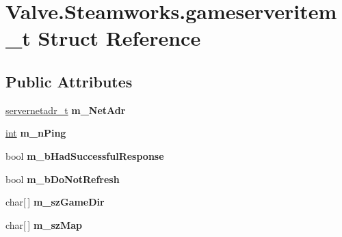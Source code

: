 \hypertarget{structValve_1_1Steamworks_1_1gameserveritem__t}{}\section{Valve.\+Steamworks.\+gameserveritem\+\_\+t Struct Reference}
\label{structValve_1_1Steamworks_1_1gameserveritem__t}
\subsection*{Public Attributes}
\begin{DoxyCompactItemize}
\item 
\hypertarget{structValve_1_1Steamworks_1_1gameserveritem__t_a0615f865a0dca410f72a32771943315a}{}\hyperlink{structValve_1_1Steamworks_1_1servernetadr__t}{servernetadr\+\_\+t} {\bfseries m\+\_\+\+Net\+Adr}\label{structValve_1_1Steamworks_1_1gameserveritem__t_a0615f865a0dca410f72a32771943315a}

\item 
\hypertarget{structValve_1_1Steamworks_1_1gameserveritem__t_a3effb9d4c0b04cb10e9e96a8c0b64c9f}{}\hyperlink{SDL__thread_8h_a6a64f9be4433e4de6e2f2f548cf3c08e}{int} {\bfseries m\+\_\+n\+Ping}\label{structValve_1_1Steamworks_1_1gameserveritem__t_a3effb9d4c0b04cb10e9e96a8c0b64c9f}

\item 
\hypertarget{structValve_1_1Steamworks_1_1gameserveritem__t_a1b943466cd83b9b1bdc516ad65ed3dc7}{}bool {\bfseries m\+\_\+b\+Had\+Successful\+Response}\label{structValve_1_1Steamworks_1_1gameserveritem__t_a1b943466cd83b9b1bdc516ad65ed3dc7}

\item 
\hypertarget{structValve_1_1Steamworks_1_1gameserveritem__t_a40f19606d3d09ca0a71308bf3a742b6f}{}bool {\bfseries m\+\_\+b\+Do\+Not\+Refresh}\label{structValve_1_1Steamworks_1_1gameserveritem__t_a40f19606d3d09ca0a71308bf3a742b6f}

\item 
\hypertarget{structValve_1_1Steamworks_1_1gameserveritem__t_ad87b89ae45930f503d6151b770a33cbf}{}char\mbox{[}$\,$\mbox{]} {\bfseries m\+\_\+sz\+Game\+Dir}\label{structValve_1_1Steamworks_1_1gameserveritem__t_ad87b89ae45930f503d6151b770a33cbf}

\item 
\hypertarget{structValve_1_1Steamworks_1_1gameserveritem__t_a4e34dd8d0cede9475cc22e9dce0c8e95}{}char\mbox{[}$\,$\mbox{]} {\bfseries m\+\_\+sz\+Map}\label{structValve_1_1Steamworks_1_1gameserveritem__t_a4e34dd8d0cede9475cc22e9dce0c8e95}


\end{DoxyCompactItemize}
